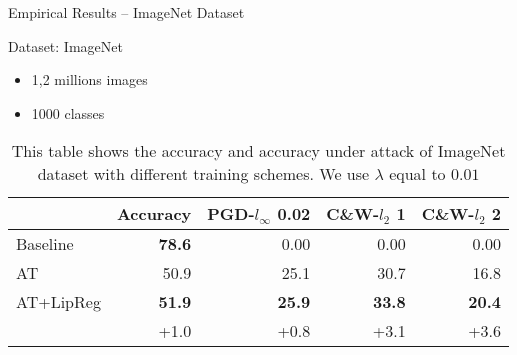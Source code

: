 \begin{frame}{Empirical Results -- ImageNet Dataset}

  \begin{block}{Dataset: ImageNet}
  \begin{itemize}
    \item 1,2 millions images
    \item 1000 classes
  \end{itemize}
  \end{block}

  \begin{table}[htbp]
    \centering
     {\small
       \begin{tabular}{lrrrr}
       \toprule
	 & \multicolumn{1}{l}{\textbf{Accuracy}} & \multicolumn{1}{c}{\textbf{PGD-}$l_\infty$ 0.02} & \multicolumn{1}{l}{\textbf{C\&W-}$l_2$ 1} & \multicolumn{1}{l}{\textbf{C\&W-}$l_2$ 2} \\
       \midrule
       Baseline  & \textbf{78.6} & 0.00 & 0.00 & 0.00 \\
       AT & 50.9 & 25.1 & 30.7 & 16.8 \\
       AT+LipReg & \textbf{51.9} & \textbf{25.9} & \textbf{33.8} & \textbf{20.4} \\
	\midrule
	 & +1.0 & +0.8 & +3.1 & +3.6 \\
       \bottomrule
       \end{tabular}%
       \caption{This table shows the accuracy and accuracy under attack of ImageNet dataset with different training schemes. We use $\lambda$  equal to $0.01$}
     }
  \end{table}%


\end{frame}








